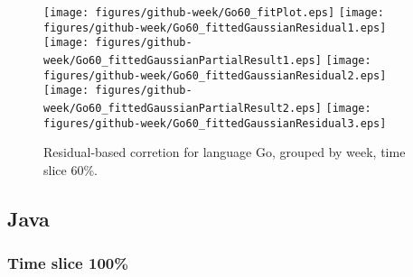 \begin{figure}[hb]
\centering
{}
{\texttt{[image: figures/github-week/Go60\_fitPlot.eps]}}
{\texttt{[image: figures/github-week/Go60\_fittedGaussianResidual1.eps]}}
{\texttt{[image: figures/github-week/Go60\_fittedGaussianPartialResult1.eps]}}
{\texttt{[image: figures/github-week/Go60\_fittedGaussianResidual2.eps]}}
{\texttt{[image: figures/github-week/Go60\_fittedGaussianPartialResult2.eps]}}
{\texttt{[image: figures/github-week/Go60\_fittedGaussianResidual3.eps]}}
\caption{Residual-based corretion for language Go, grouped by week, time slice 60\%.}
\end{figure}


\clearpage 
\newpage 


\subsection{Java}

\FloatBarrier

\subsubsection{Time slice 100\%}

